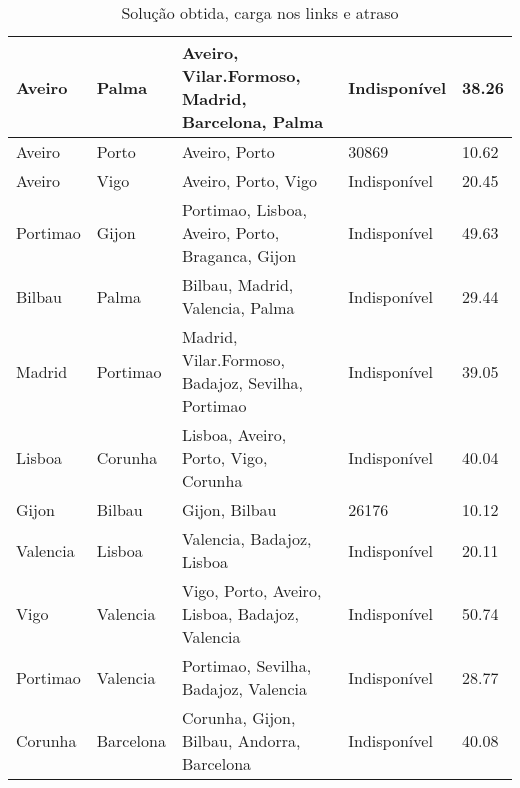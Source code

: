 \begin{table}[!htb]
{\begin{tabular}{|l|l|l|l|l|}
Aveiro & Palma & Aveiro, Vilar.Formoso, Madrid, Barcelona, Palma & Indisponível & 38.26 \\ \hline
Aveiro & Porto & Aveiro, Porto & 30869 & 10.62 \\ \hline
Aveiro & Vigo & Aveiro, Porto, Vigo & Indisponível & 20.45 \\ \hline
Portimao & Gijon & Portimao, Lisboa, Aveiro, Porto, Braganca, Gijon & Indisponível & 49.63 \\ \hline
Bilbau & Palma & Bilbau, Madrid, Valencia, Palma & Indisponível & 29.44 \\ \hline
Madrid & Portimao & Madrid, Vilar.Formoso, Badajoz, Sevilha, Portimao & Indisponível & 39.05 \\ \hline
Lisboa & Corunha & Lisboa, Aveiro, Porto, Vigo, Corunha & Indisponível & 40.04 \\ \hline
Gijon & Bilbau & Gijon, Bilbau & 26176 & 10.12 \\ \hline
Valencia & Lisboa & Valencia, Badajoz, Lisboa & Indisponível & 20.11 \\ \hline
Vigo & Valencia & Vigo, Porto, Aveiro, Lisboa, Badajoz, Valencia & Indisponível & 50.74 \\ \hline
Portimao & Valencia & Portimao, Sevilha, Badajoz, Valencia & Indisponível & 28.77 \\ \hline
Corunha & Barcelona & Corunha, Gijon, Bilbau, Andorra, Barcelona & Indisponível & 40.08 \\ \hline
\end{tabular}}
\caption[]{Solução obtida, carga nos links e atraso}
\end{table}

